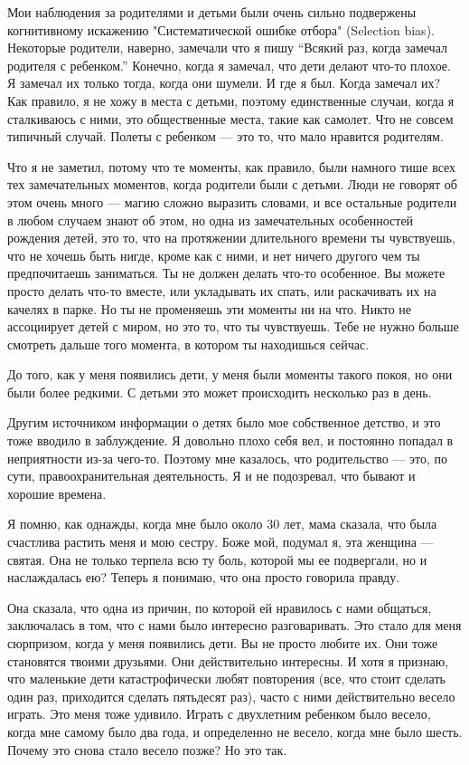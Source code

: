 \documentclass[ebook,12pt,oneside,openany]{memoir}
\begin{document}
Мои наблюдения за родителями и детьми были очень сильно подвержены
когнитивному искажению "Систематической ошибке отбора" (Selection
bias). Некоторые родители, наверно, замечали что я пишу “Всякий раз,
когда замечал родителя с ребенком.” Конечно, когда я замечал, что дети
делают что-то плохое. Я замечал их только тогда, когда они шумели. И
где я был. Когда замечал их? Как правило, я не хожу в места с детьми,
поэтому единственные случаи, когда я сталкиваюсь с ними, это
общественные места, такие как самолет. Что не совсем типичный случай.
Полеты с ребенком — это то, что мало нравится родителям.

Что я не заметил, потому что те моменты, как правило, были намного
тише всех тех замечательных моментов, когда родители были с детьми.
Люди не говорят об этом очень много — магию сложно выразить словами, и
все остальные родители в любом случаем знают об этом, но одна из
замечательных особенностей рождения детей, это то, что на протяжении
длительного времени ты чувствуешь, что не хочешь быть нигде, кроме как
с ними, и нет ничего другого чем ты предпочитаешь заниматься. Ты не
должен делать что-то особенное. Вы можете просто делать что-то вместе,
или укладывать их спать, или раскачивать их на качелях в парке. Но ты
не променяешь эти моменты ни на что. Никто не ассоциирует детей с
миром, но это то, что ты чувствуешь. Тебе не нужно больше смотреть
дальше того момента, в котором ты находишься сейчас.

До того, как у меня появились дети, у меня были моменты такого покоя,
но они были более редкими. С детьми это может происходить несколько
раз в день.

Другим источником информации о детях было мое собственное детство, и
это тоже вводило в заблуждение. Я довольно плохо себя вел, и постоянно
попадал в неприятности из-за чего-то. Поэтому мне казалось, что
родительство — это, по сути, правоохранительная деятельность. Я и не
подозревал, что бывают и хорошие времена.

Я помню, как однажды, когда мне было около 30 лет, мама сказала, что
была счастлива растить меня и мою сестру. Боже мой, подумал я, эта
женщина — святая. Она не только терпела всю ту боль, которой мы ее
подвергали, но и наслаждалась ею? Теперь я понимаю, что она просто
говорила правду.

Она сказала, что одна из причин, по которой ей нравилось с нами
общаться, заключалась в том, что с нами было интересно разговаривать.
Это стало для меня сюрпризом, когда у меня появились дети. Вы не
просто любите их. Они тоже становятся твоими друзьями. Они
действительно интересны. И хотя я признаю, что маленькие дети
катастрофически любят повторения (все, что стоит сделать один раз,
приходится сделать пятьдесят раз), часто с ними действительно весело
играть. Это меня тоже удивило. Играть с двухлетним ребенком было
весело, когда мне самому было два года, и определенно не весело, когда
мне было шесть. Почему это снова стало весело позже? Но это так.
\end{document}
